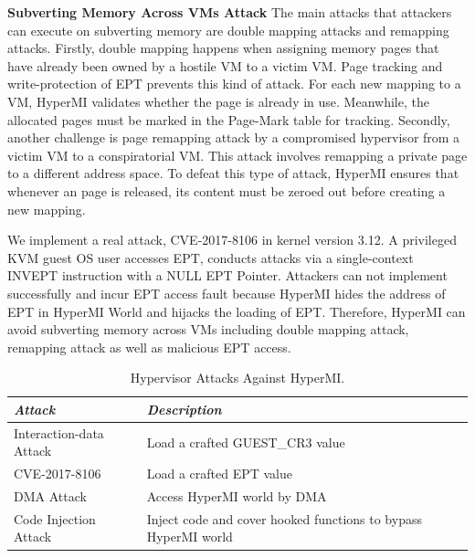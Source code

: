 \documentclass[conference]{IEEEtran}
\begin{document}
\textbf{Subverting Memory Across VMs Attack}
%
The main attacks that attackers can execute on subverting memory are double mapping attacks and remapping attacks.
Firstly, double mapping happens when assigning memory pages that have already been owned by a hostile VM to a victim VM. Page tracking and write-protection of EPT prevents this kind of attack. For each new mapping to a VM, HyperMI validates whether the page is already in use. Meanwhile, the allocated pages must be marked in the Page-Mark table for tracking. Secondly, another challenge is page remapping attack by a compromised hypervisor from a victim VM to a conspiratorial VM. This attack involves remapping a private page to a different address space. To defeat this type of attack, HyperMI ensures that whenever an page is released, its content must be zeroed out before creating a new mapping.


We implement a real attack, CVE-2017-8106 in kernel version 3.12. A privileged KVM guest OS user accesses EPT, conducts attacks via a single-context INVEPT instruction with a NULL EPT Pointer. Attackers can not implement successfully and incur EPT access fault because HyperMI hides the address of EPT in HyperMI World and hijacks the loading of EPT. Therefore, HyperMI can avoid subverting memory across VMs including double mapping attack, remapping attack as well as malicious EPT access.


\begin{table}
\centering
\caption{Hypervisor Attacks Against HyperMI.}\label{tab3}
\begin{tabular}{p{2.8cm}|p{5.5cm}}
\hline
{\itshape\bfseries Attack} & {\itshape\bfseries Description} \\
\hline
Interaction-data Attack & Load a crafted GUEST\_CR3 value\\
\hline
CVE-2017-8106 & Load a crafted EPT value \\
\hline
DMA Attack & Access HyperMI world by DMA \\
\hline
Code Injection Attack & Inject code and cover hooked functions to bypass HyperMI world \\
\hline
\end{tabular}
\end{table}
\end{document}
